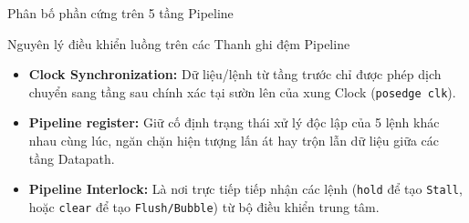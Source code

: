 \begin{frame}{Phân bố phần cứng trên 5 tầng Pipeline}
    
    \vspace{0.3cm}
    \begin{block}{Nguyên lý điều khiển luồng trên các Thanh ghi đệm Pipeline}
        \scriptsize
        \begin{itemize}
            \item \textbf{Clock Synchronization:} Dữ liệu/lệnh từ tầng trước chỉ được phép dịch chuyển sang tầng sau chính xác tại sườn lên của xung Clock (\texttt{posedge clk}).
            \item \textbf{Pipeline register:} Giữ cố định trạng thái xử lý độc lập của 5 lệnh khác nhau cùng lúc, ngăn chặn hiện tượng lấn át hay trộn lẫn dữ liệu giữa các tầng Datapath.
            \item \textbf{Pipeline Interlock:} Là nơi trực tiếp tiếp nhận các lệnh (\texttt{hold} để tạo \texttt{Stall}, hoặc \texttt{clear} để tạo \texttt{Flush/Bubble}) từ bộ điều khiển trung tâm.
        \end{itemize}
    \end{block}
\end{frame}


